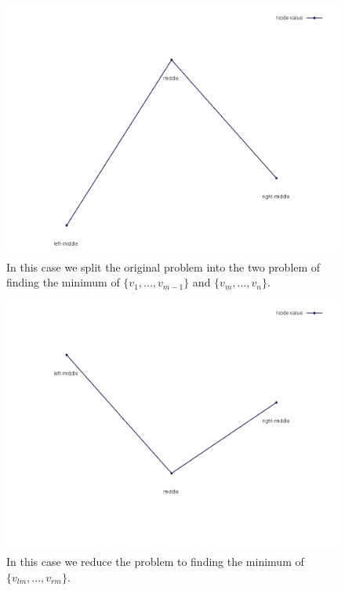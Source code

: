 \documentclass[12pt]{article}
\begin{document}
    \begin{figure}[H]
        \centering
        \includegraphics[scale=.35]{mid_case1}
        \caption{In this case we split the original problem into the two problem of finding the minimum of $\{v_1,..., v_{m - 1}\}$ and $\{v_m, ..., v_n\}$.}
    \end{figure}
    \begin{figure}[H]
        \centering
        \includegraphics[scale=.35]{mid_case2}
        \caption{In this case we reduce the problem to finding the minimum of $\{v_{lm}, ..., v_{rm}\}$.}
    \end{figure}
\end{document}

